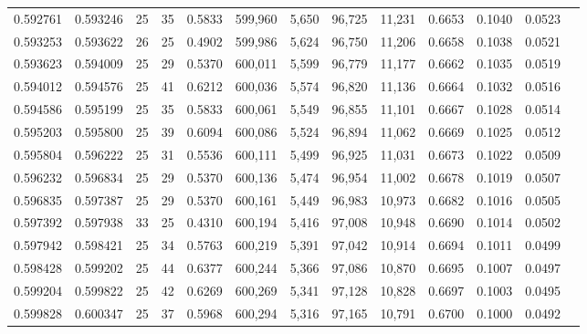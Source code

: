 \begin{tabular}{rrrrrrrrrrrrr}
0.592761 & 0.593246 &    25 &  35 &                                     0.5833 & 599,960 &   5,650 &  96,725 &  11,231 & 0.6653 & 0.1040 & 0.0523 \\
0.593253 & 0.593622 &    26 &  25 &                                     0.4902 & 599,986 &   5,624 &  96,750 &  11,206 & 0.6658 & 0.1038 & 0.0521 \\
0.593623 & 0.594009 &    25 &  29 &                                     0.5370 & 600,011 &   5,599 &  96,779 &  11,177 & 0.6662 & 0.1035 & 0.0519 \\
0.594012 & 0.594576 &    25 &  41 &                                     0.6212 & 600,036 &   5,574 &  96,820 &  11,136 & 0.6664 & 0.1032 & 0.0516 \\
0.594586 & 0.595199 &    25 &  35 &                                     0.5833 & 600,061 &   5,549 &  96,855 &  11,101 & 0.6667 & 0.1028 & 0.0514 \\
0.595203 & 0.595800 &    25 &  39 &                                     0.6094 & 600,086 &   5,524 &  96,894 &  11,062 & 0.6669 & 0.1025 & 0.0512 \\
0.595804 & 0.596222 &    25 &  31 &                                     0.5536 & 600,111 &   5,499 &  96,925 &  11,031 & 0.6673 & 0.1022 & 0.0509 \\
0.596232 & 0.596834 &    25 &  29 &                                     0.5370 & 600,136 &   5,474 &  96,954 &  11,002 & 0.6678 & 0.1019 & 0.0507 \\
0.596835 & 0.597387 &    25 &  29 &                                     0.5370 & 600,161 &   5,449 &  96,983 &  10,973 & 0.6682 & 0.1016 & 0.0505 \\
0.597392 & 0.597938 &    33 &  25 &                                     0.4310 & 600,194 &   5,416 &  97,008 &  10,948 & 0.6690 & 0.1014 & 0.0502 \\
0.597942 & 0.598421 &    25 &  34 &                                     0.5763 & 600,219 &   5,391 &  97,042 &  10,914 & 0.6694 & 0.1011 & 0.0499 \\
0.598428 & 0.599202 &    25 &  44 &                                     0.6377 & 600,244 &   5,366 &  97,086 &  10,870 & 0.6695 & 0.1007 & 0.0497 \\
0.599204 & 0.599822 &    25 &  42 &                                     0.6269 & 600,269 &   5,341 &  97,128 &  10,828 & 0.6697 & 0.1003 & 0.0495 \\
0.599828 & 0.600347 &    25 &  37 &                                     0.5968 & 600,294 &   5,316 &  97,165 &  10,791 & 0.6700 & 0.1000 & 0.0492 \\

\end{tabular}
